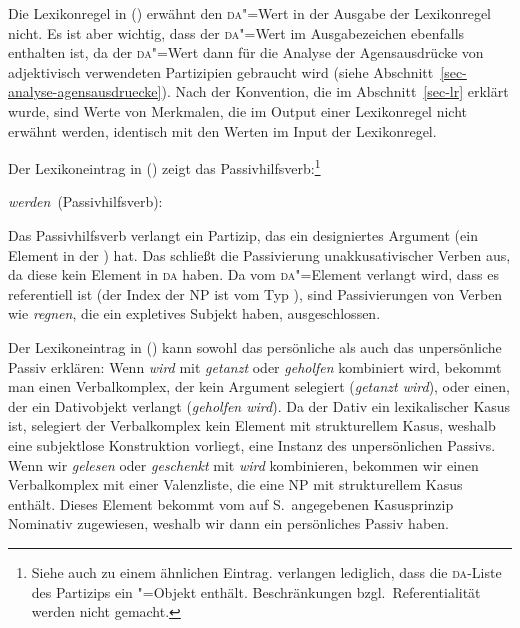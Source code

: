 Die Lexikonregel in () erwähnt den \textsc{da}"=Wert in der Ausgabe der Lexikonregel nicht. Es ist aber wichtig,
dass der \textsc{da}"=Wert im Ausgabezeichen ebenfalls enthalten ist, da der \textsc{da}"=Wert dann für die
Analyse der Agensausdrücke von adjektivisch verwendeten Partizipien gebraucht wird
(siehe Abschnitt~\ref{sec-analyse-agensausdruecke}). Nach der Konvention,
die im Abschnitt~\ref{sec-lr} erklärt wurde, sind Werte von Merkmalen, die im Output einer
Lexikonregel nicht erwähnt werden, identisch mit den Werten im Input der Lexikonregel.

Der Lexikoneintrag in () zeigt das Passivhilfsverb:\footnote{
  Siehe auch  zu einem ähnlichen Eintrag. \citeauthor{HM94a} verlangen
  lediglich, dass die \textsc{da}-Liste des Partizips ein "=Objekt enthält. Beschränkungen bzgl.\
  Referentialität werden nicht gemacht.%
}

\eas
\label{le-werden-passive-da}%
\mbox{\emph{werden} (Passivhilfsverb):}\\
\ms{
head$|$da & \eliste\\
arg-st    & \ibox{1} \oplus\ \sliste{ V[\type{ppp}, \textsc{lex}+, \textsc{da} \nliste{ \npref }, \textsc{comps} \ibox{1}] }\\
}
\zs

\noindent
Das Passivhilfsverb verlangt ein Partizip, das ein designiertes Argument (ein Element in der \daliste) hat.
Das schließt die Passivierung unakkusativischer Verben aus, da diese kein Element in \textsc{da} haben.
Da vom \textsc{da}"=Element verlangt wird, dass es referentiell ist (der Index der NP ist vom Typ
\type{ref}\istype{ref}), sind Passivierungen von Verben wie \emph{regnen}, die ein expletives Subjekt haben, ausgeschlossen.

Der Lexikoneintrag in () kann sowohl das persönliche als auch das unpersönliche Passiv
erklären: Wenn \emph{wird} mit \emph{getanzt} oder \emph{geholfen} kombiniert wird,
bekommt man einen Verbalkomplex, der kein Argument selegiert (\emph{getanzt wird}), 
oder einen, der ein Dativobjekt verlangt (\emph{geholfen wird}). Da der Dativ ein lexikalischer
Kasus ist, selegiert der Verbalkomplex kein Element mit strukturellem Kasus, weshalb eine
subjektlose Konstruktion vorliegt, \dash eine Instanz des unpersönlichen Passivs.
Wenn wir \emph{gelesen} oder \emph{geschenkt} mit \emph{wird} kombinieren, bekommen
wir einen Verbalkomplex mit einer Valenzliste, die eine NP mit strukturellem Kasus enthält.
Dieses Element bekommt vom auf S.\,\pageref{case-p} angegebenen Kasusprinzip
Nominativ zugewiesen, weshalb wir dann ein persönliches Passiv haben.

